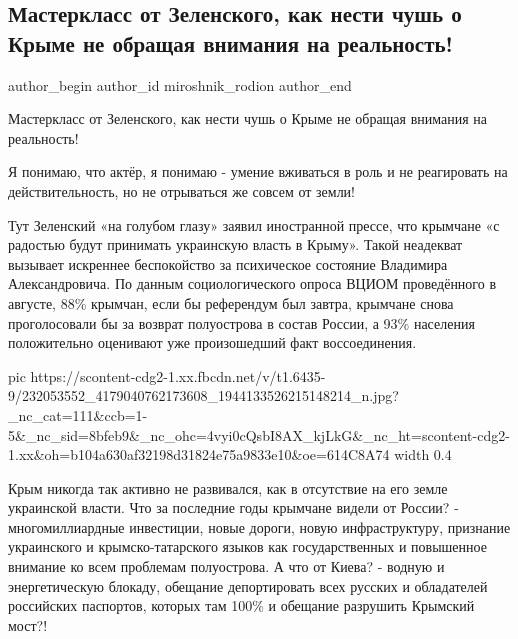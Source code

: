  
 
 
 
 
 
\subsection{Мастеркласс от Зеленского, как нести чушь о Крыме не обращая внимания на реальность!}
\label{sec:20_08_2021.fb.miroshnik_rodion.1.masterklass_zelenskii_krym}
 
\ifcmt
 author_begin
   author_id miroshnik_rodion
 author_end
\fi

Мастеркласс от Зеленского, как нести чушь о Крыме не обращая внимания на
реальность! 

Я понимаю, что актёр, я понимаю - умение вживаться в роль и не реагировать на
действительность, но не отрываться же совсем от земли! 

Тут Зеленский «на голубом глазу» заявил иностранной прессе, что крымчане «с
радостью будут принимать украинскую власть в Крыму». Такой неадекват вызывает
искреннее беспокойство за психическое состояние Владимира Александровича. По
данным социологического опроса ВЦИОМ проведённого в августе, 88\% крымчан, если
бы референдум был завтра, крымчане снова проголосовали бы за возврат
полуострова в состав России, а 93\% населения положительно оценивают уже
произошедший факт воссоединения.

\ifcmt
  pic https://scontent-cdg2-1.xx.fbcdn.net/v/t1.6435-9/232053552_4179040762173608_1944133526215148214_n.jpg?_nc_cat=111&ccb=1-5&_nc_sid=8bfeb9&_nc_ohc=4vyi0cQsbI8AX_kjLkG&_nc_ht=scontent-cdg2-1.xx&oh=b104a630af32198d31824e75a9833e10&oe=614C8A74
  width 0.4
\fi

Крым никогда так активно не развивался, как в отсутствие на его земле
украинской власти. Что за последние годы крымчане видели от России? -
многомиллиардные инвестиции, новые дороги, новую инфраструктуру, признание
украинского и крымско-татарского языков как государственных и повышенное
внимание ко всем проблемам полуострова. А что от Киева? - водную и
энергетическую блокаду, обещание депортировать всех русских и обладателей
российских паспортов, которых там 100\% и обещание разрушить Крымский мост?! 

